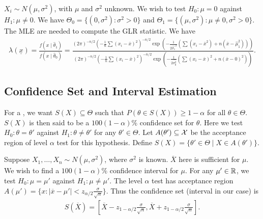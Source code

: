 \begin{example}
    $X_{i} \sim N(\mu,\sigma^{2})$, with $\mu$ and $\sigma^{2}$ unknown. We wish to test $H_{0}:\mu = 0$ against $H_{1}:\mu \neq 0$. We have $\Theta_{0} = \{(0,\sigma^{2}):\sigma^{2} > 0\}$ and $\Theta_{1} = \{(\mu,\sigma^{2}):\mu \neq 0, \sigma^{2} > 0\}$. The MLE are needed to compute the GLR statistic. We have
    \begin{align}
        \lambda(\underline{x}) = \frac{f(x \mid \hat{\theta}_{1})}{f(x \mid \hat{\theta}_{0})} = \frac{(2\pi)^{-n/2} (-\frac{1}{n} \sum (x_{i}-\overline{x})^{2})^{-n/2} \exp(-\frac{1}{2\hat{\sigma_{1}}^{2}}(\sum (x_{i}-\overline{x}^{2})+n(\overline{x}-\hat{\mu}_{1}^{2})))}{(2\pi)^{-n/2} (-\frac{1}{n} \sum (x_{i}-\overline{x})^{2})^{-n/2} \exp(-\frac{1}{2\hat{\sigma_{0}^{2}}}(\sum (x_{i}-\overline{x})^{2}+n(\overline{x}-0)^{2}))}.
    \end{align}
\end{example}

\subsection{Confidence Set and Interval Estimation}

For a , we want $S(X) \subseteq \Theta$ such that $P(\theta \in S(X)) \geq 1 - \alpha$ for all $\theta \in \Theta$. $S(X)$ is then said to be a $100(1-\alpha)\%$ confidence set for $\theta$. Here we test $H_{0}:\theta = \theta'$ against $H_{1}:\theta \neq \theta'$ for any $\theta' \in \Theta$. Let $A(\theta') \subseteq \mathcal{X}$ be the acceptance region of level $\alpha$ test for this hypothesis. Define $S(X) = \{\theta' \in \Theta \mid X \in A(\theta')\}$.

\begin{example}
    Suppose $X_{1},\ldots,X_{n} \sim N(\mu,\sigma^{2})$, where $\sigma^{2}$ is known. $\overline{X}$ here is sufficient for $\mu$. We wish to find a $100(1-\alpha)\%$ confidence interval for $\mu$. For any $\mu' \in \mathbb{R}$, we test $H_{0}:\mu = \mu'$ against $H_{1}:\mu \neq \mu'$. The level $\alpha$ test has acceptance region $A(\mu') = \{x : |\overline{x} - \mu'| < z_{\alpha/2} \frac{\sigma}{\sqrt{n}}\}$. Thus the confidence set (interval in our case) is
    \begin{align}
        S(\overline{X}) = \left[ \overline{X} - z_{1-\alpha/2} \frac{\sigma}{\sqrt{n}}, \overline{X} + z_{1-\alpha/2} \frac{\sigma}{\sqrt{n}} \right].
    \end{align}
\end{example}

